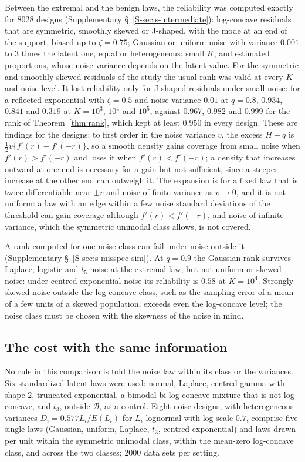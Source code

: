 \documentclass[12pt]{article}
\theoremstyle{definition}
\newcommand{\B}{\mathcal{B}}
\begin{document}
Between the extremal and the benign laws, the reliability was computed exactly for $8028$ designs (Supplementary \S~\ref{S-sec:s-intermediate}): log-concave residuals that are symmetric, smoothly skewed or J-shaped, with the mode at an end of the support, biased up to $\zeta = 0.75$; Gaussian or uniform noise with variance $0.001$ to $3$ times the latent one, equal or heterogeneous; small $K$; and estimated proportions, whose noise variance depends on the latent value. For the symmetric and smoothly skewed residuals of the study the usual rank was valid at every $K$ and noise level. It lost reliability only for J-shaped residuals under small noise: for a reflected exponential with $\zeta = 0.5$ and noise variance $0.01$ at $q = 0.8$, $0.934$, $0.841$ and $0.319$ at $K = 10^3$, $10^4$ and $10^5$, against $0.967$, $0.982$ and $0.999$ for the rank of Theorem~\ref{thm:rank}, which kept at least $0.950$ in every design. These are findings for the designs: to first order in the noise variance $v$, the excess $H - q$ is $\tfrac12 v\{f'(r) - f'(-r)\}$, so a smooth density gains coverage from small noise when $f'(r) > f'(-r)$ and loses it when $f'(r) < f'(-r)$; a density that increases outward at one end is necessary for a gain but not sufficient, since a steeper increase at the other end can outweigh it. The expansion is for a fixed law that is twice differentiable near $\pm r$ and noise of finite variance as $v \to 0$, and it is not uniform: a law with an edge within a few noise standard deviations of the threshold can gain coverage although $f'(r) < f'(-r)$, and noise of infinite variance, which the symmetric unimodal class allows, is not covered.

A rank computed for one noise class can fail under noise outside it (Supplementary \S~\ref{S-sec:s-misspec-sim}). At $q = 0.9$ the Gaussian rank survives Laplace, logistic and $t_5$ noise at the extremal law, but not uniform or skewed noise: under centred exponential noise its reliability is $0.58$ at $K = 10^4$. Strongly skewed noise outside the log-concave class, such as the sampling error of a mean of a few units of a skewed population, exceeds even the log-concave level; the noise class must be chosen with the skewness of the noise in mind.

\subsection{The cost with the same information}\label{sec:cost}

No rule in this comparison is told the noise law within its class or the variances. Six standardized latent laws were used: normal, Laplace, centred gamma with shape $2$, truncated exponential, a bimodal bi-log-concave mixture that is not log-concave, and $t_3$, outside $\B$, as a control. Eight noise designs, with heterogeneous variances $D_i = 0.577 L_i/E(L_i)$ for $L_i$ lognormal with log-scale $0.7$, comprise five single laws (Gaussian, uniform, Laplace, $t_3$, centred exponential) and laws drawn per unit within the symmetric unimodal class, within the mean-zero log-concave class, and across the two classes; $2000$ data sets per setting.
\end{document}

